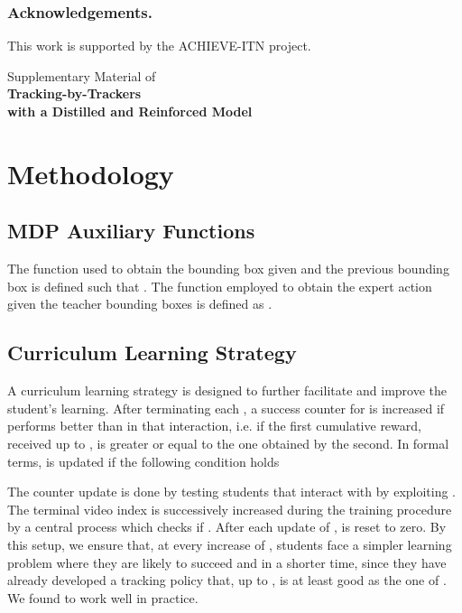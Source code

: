 \documentclass[runningheads]{llncs}
\begin{document}
\subsubsection{Acknowledgements.} This work is supported by the ACHIEVE-ITN project.




\clearpage
\appendix

\begin{center}
Supplementary Material of \\
\Large
\textbf{Tracking-by-Trackers \\
with a Distilled and Reinforced Model}
\end{center}



\section{Methodology}

\subsection{MDP Auxiliary Functions}
\label{sec:mdpaux}

The function  used to obtain the bounding box  given  and the previous bounding box  is defined such that
.
The function  employed to obtain the expert action  given the teacher bounding boxes  is defined as
.

\subsection{Curriculum Learning Strategy}
\label{sec:curriculum}
A curriculum learning strategy \cite{Bengio2009} is designed to further facilitate and improve the student's learning. 
After terminating each , a success counter  for  is increased if  performs better than  in that interaction, i.e. if the first cumulative reward, received up to , is greater or equal to the one obtained by the second. In formal terms,  is updated if the following condition holds

The counter update is done by testing students that interact with  by exploiting . 
The terminal video index  is successively increased during the training procedure by a central process which checks if
. After each update of ,  is reset to zero. 
By this setup, we ensure that, at every increase of , students face a simpler learning problem where they are likely to succeed and in a shorter time, since they have already developed a tracking policy that, up to , is at least good as the one of . We found  to work well in practice.
\end{document}
